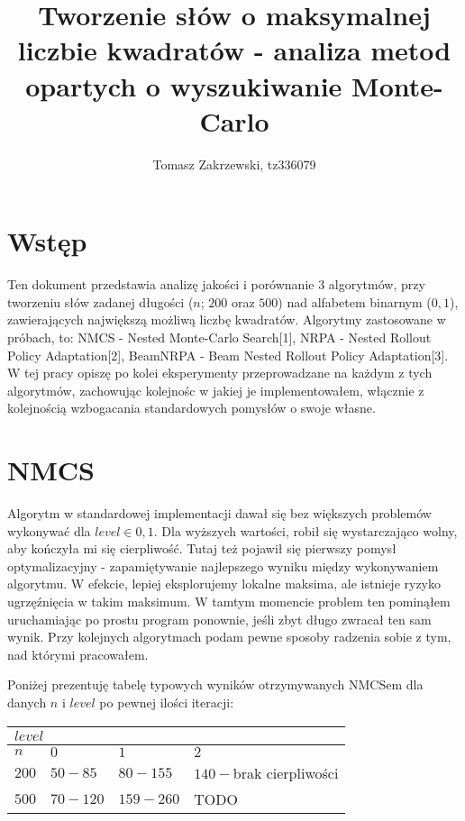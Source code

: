 \documentclass[a4paper,10pt]{article}
\title{Tworzenie słów o maksymalnej liczbie kwadratów - analiza metod opartych o wyszukiwanie Monte-Carlo}
\author{Tomasz Zakrzewski, tz336079}
\begin{document}
\maketitle

\section{Wstęp}
Ten dokument przedstawia analizę jakości i porównanie 3 algorytmów, przy tworzeniu słów zadanej długości ($n$; $200$ oraz $500$) nad alfabetem binarnym (${0, 1}$), zawierających największą możliwą liczbę 
kwadratów. Algorytmy zastosowane w próbach, to: NMCS - Nested Monte-Carlo Search[1], NRPA - Nested Rollout Policy Adaptation[2], BeamNRPA - Beam Nested Rollout Policy Adaptation[3]. W tej pracy opiszę
po kolei eksperymenty przeprowadzane na każdym z tych algorytmów, zachowując kolejnośc w jakiej je implementowałem, włącznie z kolejnością wzbogacania standardowych pomysłów o swoje własne.

\section{NMCS}
Algorytm w standardowej implementacji dawał się bez większych problemów wykonywać dla $level \in {0, 1}$. Dla wyższych wartości, robił się wystarczająco wolny, aby kończyła mi się cierpliwość. Tutaj też
pojawił się pierwszy pomysł optymalizacyjny - zapamiętywanie najlepszego wyniku między wykonywaniem algorytmu. W efekcie, lepiej eksplorujemy lokalne maksima, ale istnieje ryzyko ugrzęźnięcia w takim 
maksimum. W tamtym momencie problem ten pominąłem uruchamiając po prostu program ponownie, jeśli zbyt długo zwracał ten sam wynik. Przy kolejnych algorytmach podam pewne sposoby radzenia sobie z tym,
  nad którymi pracowałem.

Poniżej prezentuję tabelę typowych wyników otrzymywanych NMCSem dla danych $n$ i $level$ po pewnej ilości iteracji: \\
\begin{adjustbox}{center}
\begin{tabularx}{0.7\linewidth}{|X|X|X|X| }
  \hline
  \multicolumn{4}{|X|}{$level$} \\
  \hline
  $n$ & $0$ & $1$ & $2$ \\
  \hline
  $200$ & $50 - 85$ & $80 - 155$ & $140-$brak cierpliwości \\
  \hline
  $500$ & $70 - 120$ & $159 - 260$ & TODO \\
  \hline
\end{tabularx}
\end{adjustbox}
\end{document}
